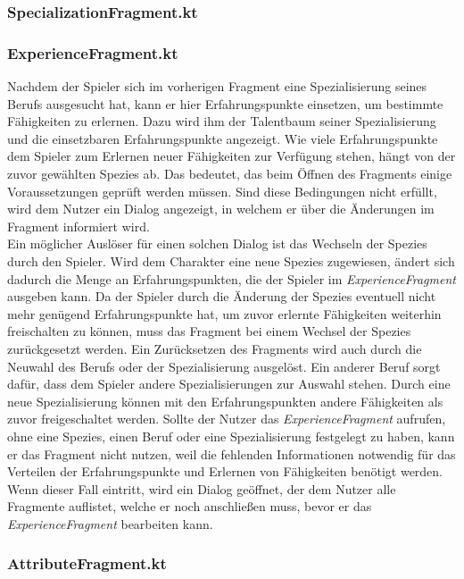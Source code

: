 \subsubsection{SpecializationFragment.kt}

\subsubsection{ExperienceFragment.kt}
Nachdem der Spieler sich im vorherigen Fragment eine Spezialisierung seines Berufs ausgesucht hat, kann er hier Erfahrungspunkte einsetzen, um bestimmte Fähigkeiten zu erlernen. Dazu wird ihm der Talentbaum seiner Spezialisierung und die einsetzbaren Erfahrungspunkte angezeigt. Wie viele Erfahrungspunkte dem Spieler zum Erlernen neuer Fähigkeiten zur Verfügung stehen, hängt von der zuvor gewählten Spezies ab. Das bedeutet, das beim Öffnen des Fragments einige Voraussetzungen geprüft werden müssen. Sind diese Bedingungen nicht erfüllt, wird dem Nutzer ein Dialog angezeigt, in welchem er über die Änderungen im Fragment informiert wird.\\

Ein möglicher Auslöser für einen solchen Dialog ist das Wechseln der Spezies durch den Spieler. Wird dem Charakter eine neue Spezies zugewiesen, ändert sich dadurch die Menge an Erfahrungspunkten, die der Spieler im \textit{ExperienceFragment} ausgeben kann. Da der Spieler durch die Änderung der Spezies eventuell nicht mehr genügend Erfahrungspunkte hat, um zuvor erlernte Fähigkeiten weiterhin freischalten zu können, muss das Fragment bei einem Wechsel der Spezies zurückgesetzt werden. Ein Zurücksetzen des Fragments wird auch durch die Neuwahl des Berufs oder der Spezialisierung ausgelöst. Ein anderer Beruf sorgt dafür, dass dem Spieler andere Spezialisierungen zur Auswahl stehen. Durch eine neue Spezialisierung können mit den Erfahrungspunkten andere Fähigkeiten als zuvor freigeschaltet werden. Sollte der Nutzer das \textit{ExperienceFragment} aufrufen, ohne eine Spezies, einen Beruf oder eine Spezialisierung festgelegt zu haben, kann er das Fragment nicht nutzen, weil die fehlenden Informationen notwendig für das Verteilen der Erfahrungspunkte und Erlernen von Fähigkeiten benötigt werden. Wenn dieser Fall eintritt, wird ein Dialog geöffnet, der dem Nutzer alle Fragmente auflistet, welche er noch anschließen muss, bevor er das \textit{ExperienceFragment} bearbeiten kann.

\subsubsection{AttributeFragment.kt}

